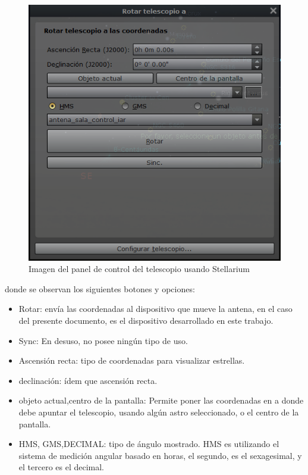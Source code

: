 \begin{figure}[ht!]
	\includegraphics{rotar_telesc}
	\caption{Imagen del panel de control del telescopio usando Stellarium}
	\label{control del telescopio en stellarium}
\end{figure}
donde se observan los siguientes botones y opciones: 
\begin{itemize}
	\item Rotar: envía las coordenadas al dispositivo que mueve la antena, en el caso del presente documento, es el dispositivo desarrollado en este trabajo. 
	\item Sync: En desuso, no posee ningún tipo de uso. 
	\item Ascensión recta: tipo de coordenadas para visualizar estrellas. 
	\item declinación: ídem que ascensión recta.  
	\item objeto actual,centro de la pantalla: Permite poner las coordenadas en a donde debe apuntar el telescopio, usando algún astro seleccionado, o el centro de la pantalla. 
	\item HMS, GMS,DECIMAL: tipo de ángulo mostrado. HMS es utilizando el sistema de medición angular basado en horas, el segundo, es el sexagesimal, y el tercero es el decimal. 
\end{itemize}

